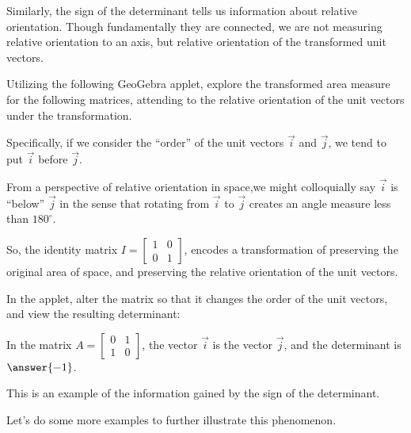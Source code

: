 \documentclass{ximera}
\begin{document}
Similarly, the sign of the determinant tells us information about relative orientation. Though fundamentally they are connected, we are not measuring relative orientation to an axis, but relative orientation of the transformed unit vectors. 

\begin{example}
    Utilizing the following GeoGebra applet, explore the transformed area measure for the following matrices, attending to the relative orientation of the unit vectors under the transformation.

    Specifically, if we consider the ``order'' of the unit vectors $\vec{i}$ and $\vec{j}$, we tend to put $\vec{i}$ before $\vec{j}$. 


    \begin{center}
    \end{center}
    
    From a perspective of relative orientation in space,we might colloquially say $\vec{i}$ is ``below'' $\vec{j}$ in the sense that rotating from $\vec{i}$ to $\vec{j}$ creates an angle measure less than $180^\circ$.

    So, the identity matrix $I=\begin{bmatrix}
        1&0\\0&1
    \end{bmatrix}$, encodes a transformation of preserving the original area of space, and preserving the relative orientation of the unit vectors. 

    In the applet, alter the matrix so that it changes the order of the unit vectors, and view the resulting determinant:

    In the matrix $A=\begin{bmatrix}
        0&1\\1&0
    \end{bmatrix}$, the vector $\vec{i}$ is 
    the vector $\vec{j}$, and the determinant is $\answer{-1}$.

    This is an example of the information gained by the sign of the determinant.

\end{example}

Let's do some more examples to further illustrate this phenomenon. 
\end{document}
